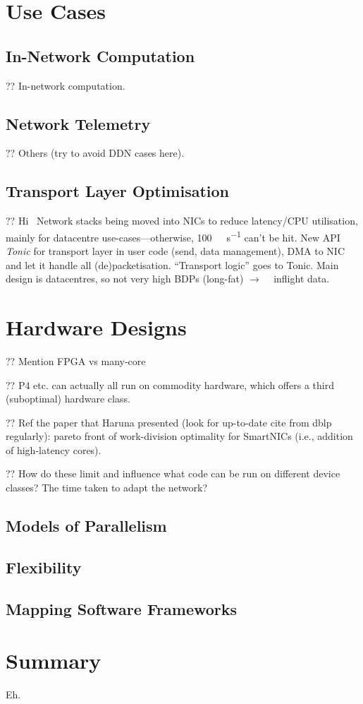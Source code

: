 \section{Use Cases}

\subsection{In-Network Computation}
?? In-network computation.

\subsection{Network Telemetry}
?? Others (try to avoid DDN cases here).

\subsection{Transport Layer Optimisation}
?? Hi~\parencite{DBLP:conf/nsdi/ArashlooLGRWW20} Network stacks being moved into NICs to reduce latency/CPU utilisation, mainly for datacentre use-cases---otherwise, \SI{100}{\giga\bit\per\second} can't be hit. New API \emph{Tonic} for transport layer in user code (send, data management), DMA to NIC and let it handle all (de)packetisation. ``Transport logic'' goes to Tonic. Main design is datacentres, so not very high BDPs (long-fat) $\rightarrow$ \si{\kilo\byte} inflight data.

\section{Hardware Designs}

?? Mention FPGA vs many-core

?? P4 etc. can actually all run on commodity hardware, which offers a third (suboptimal) hardware class.

?? Ref the paper that Haruna presented \parencite{haruna-rg-paper} (look for up-to-date cite from dblp regularly): pareto front of work-division optimality for SmartNICs (i.e., addition of high-latency cores).

?? How do these limit and influence what code can be run on different device classes? The time taken to adapt the network?

\subsection{Models of Parallelism}

\subsection{Flexibility}

\subsection{Mapping Software Frameworks}

\section{Summary}
Eh. 
